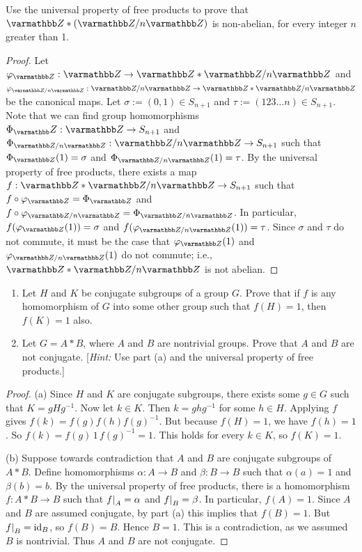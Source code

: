 \documentclass[10pt,oneside,openany]{memoir}
\begin{document}
\begin{exercise}
	Use the universal property of free products to prove that $\bfZ \ast (\bfZ/n\bfZ)$ is non-abelian, for every integer $n$ greater than 1.
\end{exercise}
	\begin{proof}
		Let $\varphi_{\bfZ}:\bfZ \rightarrow \bfZ \ast \bfZ/n\bfZ$ and $\varphi_{\bfZ/n\bfZ}:\bfZ/n\bfZ \rightarrow \bfZ \ast \bfZ/n\bfZ$ be the canonical maps. Let $\sigma :=(0,1) \in S_{n+1}$ and $\tau := (123\ldots n) \in S_{n+1}$. Note that we can find group homomorphisms $\Phi_\bfZ:\bfZ \rightarrow S_{n+1}$ and $\Phi_{\bfZ/n\bfZ}:\bfZ/n\bfZ \rightarrow S_{n+1}$ such that $\Phi_{\bfZ}(1) = \sigma$ and $\Phi_{\bfZ/n\bfZ}(1) = \tau$. By the universal property of free products, there exists a map $f:\bfZ \ast \bfZ/n\bfZ \rightarrow S_{n+1}$ such that $f \circ \varphi_{\bfZ} = \Phi_{\bfZ}$ and $f \circ \varphi_{\bfZ/n\bfZ} = \Phi_{\bfZ/n\bfZ}$. In particular, $f(\varphi_{\bfZ}(1)) = \sigma$ and $f(\varphi_{\bfZ/n\bfZ}(1)) = \tau$. Since $\sigma$ and $\tau$ do not commute, it must be the case that $\varphi_{\bfZ}(1)$ and $\varphi_{\bfZ/n\bfZ}(1)$ do not commute; i.e., $\bfZ \ast \bfZ/n\bfZ$ is not abelian.
	\end{proof}

\begin{exercise}
	\mbox{}
	\begin{enumerate}[label = (\alph*),itemsep=1pt,topsep=3pt]
		\item Let $H$ and $K$ be conjugate subgroups of a group $G$. Prove that if $f$ is any homomorphism of $G$ into some other group such that $f(H) = 1$, then $f(K)=1$ also.
		\item Let $G = A \ast B$, where $A$ and $B$ are nontrivial groups. Prove that $A$ and $B$ are not conjugate. [\textit{Hint:} Use part (a) and the universal property of free products.]
	\end{enumerate}
\end{exercise}
	\begin{proof}
		(a) Since $H$ and $K$ are conjugate subgroups, there exists some $g \in G$ such that $K = gHg^{-1}$. Now let $k \in K$. Then $k = ghg^{-1}$ for some $h \in H$. Applying $f$ gives $f(k) = f(g)f(h)f(g)^{-1}$. But because $f(H) = 1$, we have $f(h) = 1$. So $f(k) = f(g)\,1\,f(g)^{-1} = 1$. This holds for every $k \in K$, so $f(K) = 1$.

		(b) Suppose towards contradiction that $A$ and $B$ are conjugate subgroups of $A \ast B$. Define homomorphisms $\alpha:A \rightarrow B$ and $\beta:B \rightarrow B$ such that $\alpha(a) = 1$ and $\beta(b) = b$. By the universal property of free products, there is a homomorphism $f:A \ast B \rightarrow B$ such that $\restr{f}{A} = \alpha$ and $\restr{f}{B}=\beta$. In particular, $f(A) = 1$. Since $A$ and $B$ are assumed conjugate, by part (a) this implies that $f(B) = 1$. But $\restr{f}{B} = \id_B$, so $f(B) = B$. Hence $B = 1$. This is a contradiction, as we assumed $B$ is nontrivial. Thus $A$ and $B$ are not conjugate.
			
	\end{proof}
\end{document}
